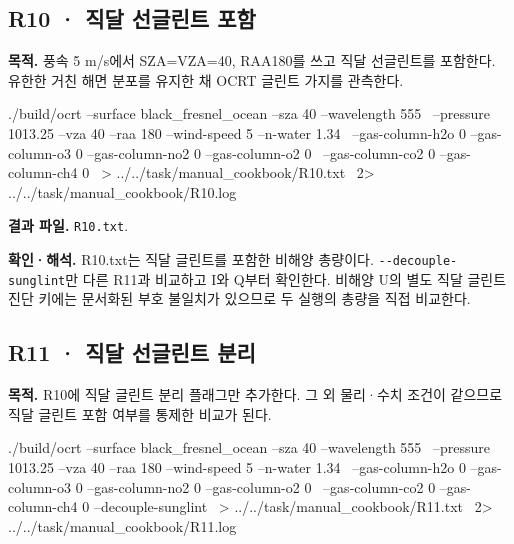 
\subsection{R10 · 직달 선글린트 포함}
\label{sec:auto:09_cookbook:3.4}

\label{recipe:R10}

\textbf{목적. }풍속 5 m/s에서 SZA=VZA=40\textdegree{}, RAA180\textdegree{}를 쓰고 직달 선글린트를 포함한다. 유한한 거친 해면 분포를 유지한 채 OCRT 글린트 가지를 관측한다.

\noindent\begin{minipage}{\linewidth}
\begin{ManualCode}

./build/ocrt --surface black_fresnel_ocean --sza 40 --wavelength 555 \
  --pressure 1013.25 --vza 40 --raa 180 --wind-speed 5 --n-water 1.34 \
  --gas-column-h2o 0 --gas-column-o3 0 --gas-column-no2 0 --gas-column-o2 0 \
  --gas-column-co2 0 --gas-column-ch4 0 \
  > ../../task/manual_cookbook/R10.txt \
  2> ../../task/manual_cookbook/R10.log

\end{ManualCode}
\end{minipage}\par

\textbf{결과 파일. }\texttt{R10.txt}.

\textbf{확인·해석. }R10.txt는 직달 글린트를 포함한 비해양 총량이다. \texttt{-\allowbreak{}-\allowbreak{}decouple-\allowbreak{}sunglint}만 다른 R11과 비교하고 I와 Q부터 확인한다. 비해양 U의 별도 직달 글린트 진단 키에는 문서화된 부호 불일치가 있으므로 두 실행의 총량을 직접 비교한다.


\subsection{R11 · 직달 선글린트 분리}
\label{sec:auto:09_cookbook:3.5}

\label{recipe:R11}

\textbf{목적. }R10에 직달 글린트 분리 플래그만 추가한다. 그 외 물리·수치 조건이 같으므로 직달 글린트 포함 여부를 통제한 비교가 된다.

\noindent\begin{minipage}{\linewidth}
\begin{ManualCode}

./build/ocrt --surface black_fresnel_ocean --sza 40 --wavelength 555 \
  --pressure 1013.25 --vza 40 --raa 180 --wind-speed 5 --n-water 1.34 \
  --gas-column-h2o 0 --gas-column-o3 0 --gas-column-no2 0 --gas-column-o2 0 \
  --gas-column-co2 0 --gas-column-ch4 0 --decouple-sunglint \
  > ../../task/manual_cookbook/R11.txt \
  2> ../../task/manual_cookbook/R11.log

\end{ManualCode}
\end{minipage}\par


